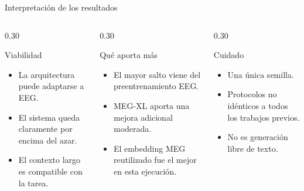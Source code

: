 \documentclass[aspectratio=169,10pt]{beamer}
\begin{document}
\begin{frame}[c]{Interpretación de los resultados}
  \small
  \begin{columns}[T,totalwidth=\linewidth]
    \begin{column}{0.30\linewidth}
      \begin{block}{Viabilidad}
        \begin{minipage}[t][30mm][t]{\linewidth}
        \begin{itemize}
          \item La arquitectura puede adaptarse a EEG.
          \item El sistema queda claramente por encima del azar.
          \item El contexto largo es compatible con la tarea.
        \end{itemize}
        \end{minipage}
      \end{block}
    \end{column}
    \hfill

    \begin{column}{0.30\linewidth}
      \begin{block}{Qué aporta más}
        \begin{minipage}[t][30mm][t]{\linewidth}
        \begin{itemize}
          \item El mayor salto viene del preentrenamiento EEG.
          \item MEG-XL aporta una mejora adicional moderada.
          \item El embedding MEG reutilizado fue el mejor en esta ejecución.
        \end{itemize}
        \end{minipage}
      \end{block}
    \end{column}
    \hfill

    \begin{column}{0.30\linewidth}
      \begin{alertblock}{Cuidado}
        \begin{minipage}[t][30mm][t]{\linewidth}
        \begin{itemize}
          \item Una única semilla.
          \item Protocolos no idénticos a todos los trabajos previos.
          \item No es generación libre de texto.
        \end{itemize}
        \end{minipage}
      \end{alertblock}
    \end{column}
  \end{columns}


\end{frame}
\end{document}
